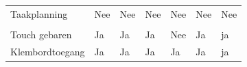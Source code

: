 \begin{table}[]
\begin{tabular}{p{6cm}p{13mm}p{15mm}p{13mm}p{13mm}p{13mm}p{13mm}}
			   Taakplanning &  \cellcolor{red!50} Nee  &  \cellcolor{red!50} Nee &  \cellcolor{red!50} Nee  & \cellcolor{red!50} Nee &  \cellcolor{red!50} Nee &  \cellcolor{red!50} Nee \\
			   
			    &  & &  &  &  &  \\
			   			   
			   Touch gebaren & \cellcolor{green!40} Ja  & \cellcolor{green!40} Ja & \cellcolor{green!40} Ja  & \cellcolor{red!50} Nee & \cellcolor{green!40} Ja & \cellcolor{green!40} ja \\
			   
			   Klembordtoegang & \cellcolor{green!40} Ja  & \cellcolor{green!40} Ja & \cellcolor{green!40} Ja  & \cellcolor{green!40} Ja & \cellcolor{green!40} Ja & \cellcolor{green!40} ja \\

  		\end{tabular}	
 	\end{table}
 	
